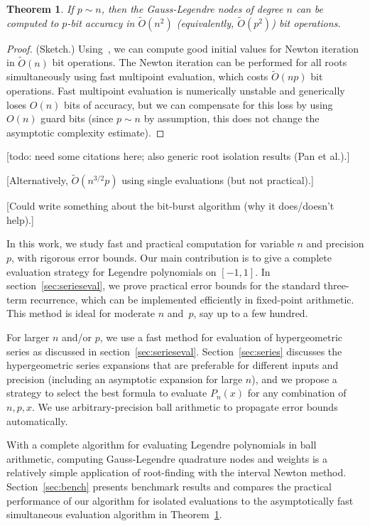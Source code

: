 \documentclass[11pt,a4paper]{article}
\newtheorem{theorem}{Theorem}
\begin{document}
\begin{theorem}
\label{thm:complexity}
If $p \sim n$, then the Gauss-Legendre nodes of degree $n$ can be computed to
$p$-bit accuracy in $\widetilde{O}(n^2)$ (equivalently, $\widetilde{O}(p^2)$) bit operations.
\end{theorem}

\begin{proof}
(Sketch.)
Using~\cite{petras1999computation},
we can compute good initial values for Newton iteration
in $\widetilde{O}(n)$ bit operations.
The Newton iteration can be performed for all roots
simultaneously using fast multipoint evaluation, which costs
$\widetilde{O}(n p)$ bit operations.
Fast multipoint evaluation is numerically unstable and
generically loses $O(n)$ bits of accuracy, but we can compensate for
this loss by using $O(n)$ guard bits
(since $p \sim n$ by assumption, this does not change the asymptotic complexity estimate).
\end{proof}

[todo: need some citations here; also generic root isolation results (Pan et al.).]

[Alternatively, $\widetilde{O}(n^{3/2} p)$ using single evaluations (but not practical).]

[Could write something about the bit-burst algorithm (why it does/doesn't help).]

In this work, we study fast and practical computation for variable $n$
and precision $p$, with rigorous error bounds.
Our main contribution is to give a complete evaluation strategy
for Legendre polynomials on $[-1,1]$.
In section~\ref{sec:serieseval},
we prove practical error bounds for the standard three-term recurrence,
which can be implemented
efficiently in fixed-point arithmetic.
This method is ideal
for moderate $n$ and~$p$, say up to a few hundred.

For larger $n$ and/or $p$, we use a fast method for evaluation
of hypergeometric series as discussed in section~\ref{sec:serieseval}.
Section~\ref{sec:series} discusses the
hypergeometric series expansions that are preferable
for different inputs and precision (including an asymptotic expansion for large $n$),
and we propose a strategy to select the best formula to evaluate $P_n(x)$
for any combination of $n, p, x$.
We use arbitrary-precision ball arithmetic to propagate error bounds
automatically.

With a complete algorithm for evaluating Legendre polynomials
in ball arithmetic,
computing Gauss-Legendre quadrature nodes and weights
is a relatively simple application of root-finding with the
interval Newton method.
Section~\ref{sec:bench} presents benchmark results
and compares the practical performance
of our algorithm for isolated evaluations
to the asymptotically fast simultaneous evaluation
algorithm in Theorem~\ref{thm:complexity}.
\end{document}
